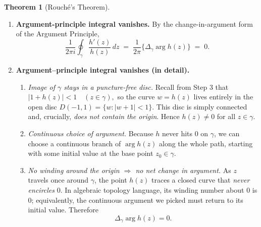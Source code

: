 \documentclass[12pt]{article}
\theoremstyle{definition} %
\newtheorem{theorem}{Theorem}
\theoremstyle{plain} %
\begin{document}
\begin{theorem}[Rouché’s Theorem]
\begin{enumerate}
        \item\textbf{Argument-principle integral vanishes.}  
              By the change-in-argument form of the Argument Principle,
              \[
                  \frac{1}{2\pi i}\oint_{\gamma}\frac{h'(z)}{h(z)}\,dz
                  \;=\;
                  \frac{1}{2\pi}\bigl\{\Delta_\gamma\arg h(z)\bigr\}
                  \;=\;0.
              \]
              \item\textbf{Argument–principle integral vanishes (in detail).}
              \begin{enumerate}
                  \item\emph{Image of $\gamma$ stays in a puncture-free disc.}  
                        Recall from Step 3 that 
                        $
                            |1+h(z)|<1 \quad (z\in\gamma),
                        $
                        so the curve $w=h(z)$ lives entirely in the open disc 
                        $
                            D(-1,1)=\{w:|w+1|<1\}.
                        $
                        This disc is simply connected and, crucially, \emph{does not contain the origin}.  
                        Hence $h(z)\neq0$ for all $z\in\gamma$.

                  \item\emph{Continuous choice of argument.}  
                        Because $h$ never hits $0$ on $\gamma$, we can choose a continuous branch of 
                        $
                            \arg h(z)
                        $
                        along the whole path, starting with some initial value at the base point $z_0\in\gamma$.

                  \item\emph{No winding around the origin $\Longrightarrow$ no net change in argument.}  
                        As $z$ travels once around $\gamma$, the point $h(z)$ traces a closed curve that \emph{never encircles} $0$.  
                        In algebraic topology language, its winding number about $0$ is $0$; equivalently,
                        the continuous argument we picked must return to its initial value.  Therefore
                        \[
                            \Delta_{\gamma}\arg h(z)=0.
                        \]


\end{enumerate}
\end{enumerate}
\end{theorem}
\end{document}
